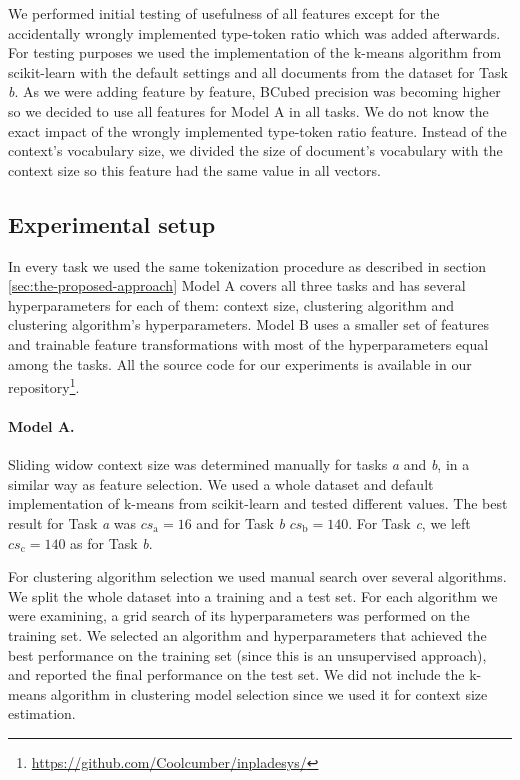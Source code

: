 \documentclass[10pt, a4paper]{article}
\begin{document}
We performed initial testing of usefulness of all features except for the accidentally wrongly implemented type-token ratio which was added afterwards. For testing purposes we used the implementation of the k-means algorithm from scikit-learn with the default settings and all documents from the dataset for Task \emph{b}. As we were adding feature by feature, BCubed precision was becoming higher so we decided to use all features for Model A in all tasks. We do not know the exact impact of the wrongly implemented type-token ratio feature. Instead of the context's vocabulary size, we divided the size of document's vocabulary with the context size so this feature had the same value in all vectors.

\subsection{Experimental setup}

In every task we used the same tokenization procedure as described in section \ref{sec:the-proposed-approach} Model A covers all three tasks and has several hyperparameters for each of them: context size, clustering algorithm and clustering algorithm's hyperparameters. Model B uses a smaller set of features and trainable feature transformations with most of the hyperparameters equal among the tasks. All the source code for our experiments is available in our repository\footnote{\url{https://github.com/Coolcumber/inpladesys/}}.

\paragraph{Model A.} 
Sliding widow context size was determined manually for tasks \emph{a} and \emph{b}, in a similar way as feature selection. We used a whole dataset and default implementation of k-means from scikit-learn and tested different values. The best result for Task \emph{a} was $\mathit{cs}_\mathrm{a}=16$ and for Task \emph{b} $\mathit{cs}_\mathrm{b}=140$. For Task \emph{c}, we left $\mathit{cs}_\mathrm{c}=140$ as for Task \emph{b}.

For clustering algorithm selection we used manual search over several algorithms. We split the whole dataset into a training and a test set. For each algorithm we were examining, a grid search of its hyperparameters was performed on the training set. We selected an algorithm and hyperparameters that achieved the best performance on the training set (since this is an unsupervised approach), and reported the final performance on the test set. We did not include the k-means algorithm in clustering model selection since we used it for context size estimation.
\end{document}
